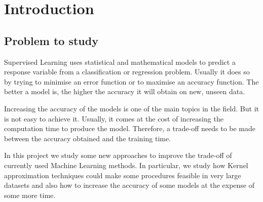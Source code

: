 
\chapter{Introduction} %

\label{Chapter1} %




\section{Problem to study}

\begin{pre-delivery}
  Supervised Learning uses statistical and mathematical models to predict a
  response variable from a classification or regression problem. Usually it does
  so by trying to minimise an error function or to maximise an accuracy function.
  The better a model is, the higher the accuracy it will obtain on new, unseen
  data.

  Increasing the accuracy of the models is one of the main topics in the field.
  But it is not easy to achieve it. Usually, it comes at the cost of increasing the
  computation time to produce the model. Therefore, a trade-off needs to be
  made between the accuracy obtained and the training time.

  In this project we study some new approaches to improve the trade-off of
  currently used Machine Learning methods. In particular, we study how
  Kernel approximation techniques could make some procedures feasible in
  very large datasets and also how to increase the accuracy of some models
  at the expense of some more time.
\end{pre-delivery}

